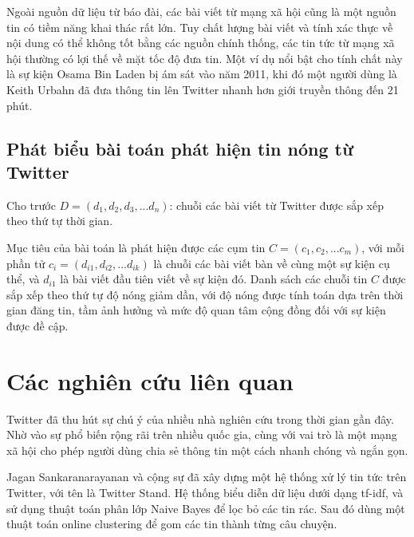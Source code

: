 	Ngoài nguồn dữ liệu từ báo đài, các bài viết từ mạng xã hội cũng là một nguồn tin có tiềm năng khai thác rất lớn. Tuy chất lượng bài viết và tính xác thực về nội dung có thể không tốt bằng các nguồn chính thống, các tin tức từ mạng xã hội thường có lợi thế về mặt tốc độ đưa tin. Một ví dụ nổi bật cho tính chất này là sự kiện Osama Bin Laden bị ám sát vào năm 2011, khi đó một người dùng là Keith Urbahn đã đưa thông tin lên Twitter nhanh hơn giới truyền thông đến 21 phút.

	\subsection{Phát biểu bài toán phát hiện tin nóng từ Twitter}
	Cho trước $D = (d_1, d_2, d_3,... d_n)$: chuỗi các bài viết từ Twitter được sắp xếp theo thứ tự thời gian.
	
	Mục tiêu của bài toán là phát hiện được các cụm tin $C = (c_1, c_2,... c_m)$, với mỗi phần tử $c_i = (d_{i1}, d_{i2},... d_{ik})$ là chuỗi các bài viết bàn về cùng một sự kiện cụ thể, và $d_{i1}$ là bài viết đầu tiên viết về sự kiện đó. Danh sách các chuỗi tin $C$  được sắp xếp theo thứ tự độ nóng giảm dần, với độ nóng được tính toán dựa trên thời gian đăng tin, tầm ảnh hưởng và mức độ quan tâm cộng đồng đối với sự kiện được đề cập.
	
	
\section{Các nghiên cứu liên quan}
Twitter đã thu hút sự chú ý của nhiều nhà nghiên cứu trong thời gian gần đây. Nhờ vào sự phổ biến rộng rãi trên nhiều quốc gia, cùng với vai trò là một mạng xã hội cho phép người dùng chia sẻ thông tin một cách nhanh chóng và ngắn gọn.

Jagan Sankaranarayanan và cộng sự \cite{TwiterStand:Sankaranarayanan} đã xây dựng một hệ thống xử lý tin tức trên Twitter, với tên là Twitter Stand. Hệ thống biểu diễn dữ liệu dưới dạng tf-idf, và sử dụng thuật toán phân lớp Naive Bayes để lọc bỏ các tin rác. Sau đó dùng một thuật toán online clustering để gom các tin thành từng câu chuyện.

